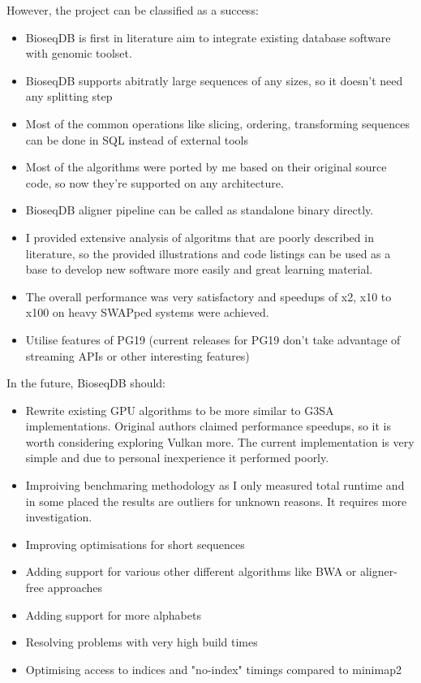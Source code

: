However, the project can be classified as a success:
\begin{itemize}
    \item BioseqDB is first in literature aim to integrate existing database software with genomic toolset.
    \item BioseqDB supports abitratly large sequences of any sizes, so it doesn't need any splitting step 
    \item Most of the common operations like slicing, ordering, transforming sequences can be done in SQL instead of external tools
    \item Most of the algorithms were ported by me based on their original source code, so now they're supported on any architecture.
    \item BioseqDB aligner pipeline can be called as standalone binary directly.
    \item I provided extensive analysis of algoritms that are poorly described in literature, so the provided illustrations and code listings can be used as a base to develop new software more easily and great learning material.
    \item The overall performance was very satisfactory and speedups of x2, x10 to x100 on heavy SWAPped systems were achieved.
    \item Utilise features of PG19 (current releases for PG19 don't take advantage of streaming APIs or other interesting features)
\end{itemize}

In the future, BioseqDB should:
\begin{itemize}
    \item Rewrite existing GPU algorithms to be more similar to G3SA implementations. Original authors claimed performance speedups, so it is worth considering 
    exploring Vulkan more. The current implementation is very simple and due to personal inexperience it performed poorly.
    \item Improiving benchmaring methodology as I only measured total runtime and in some placed the results are outliers for unknown reasons. It requires more investigation.
    \item Improving optimisations for short sequences
    \item Adding support for various other different algorithms like BWA or aligner-free approaches
    \item Adding support for more alphabets
    \item Resolving problems with very high build times
    \item Optimising access to indices and "no-index" timings compared to minimap2
\end{itemize}

